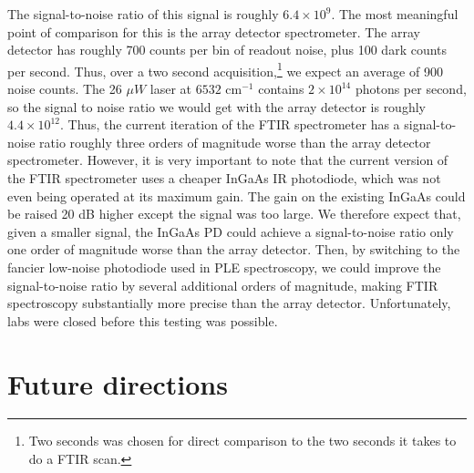 \documentclass[12pt]{report}
\newcommand{\wn}[1][ ]{cm$^{-1}$#1}
\begin{document}
The signal-to-noise ratio of this signal is roughly $6.4\times 10^{9}$. The most meaningful point of comparison for this is the array detector spectrometer. The array detector has roughly 700 counts per bin of readout noise, plus 100 dark counts per second. Thus, over a two second acquisition,\footnote{Two seconds was chosen for direct comparison to the two seconds it takes to do a FTIR scan.} we expect an average of 900 noise counts. The 26 $\mu W$ laser at $6532$ \wn contains $2\times 10^{14}$ photons per second, so the signal to noise ratio we would get with the array detector is roughly $4.4\times 10^{12}$. Thus, the current iteration of the FTIR spectrometer has a signal-to-noise ratio roughly three orders of magnitude worse than the array detector spectrometer. However, it is very important to note that the current version of the FTIR spectrometer uses a cheaper InGaAs IR photodiode, which was not even being operated at its maximum gain. The gain on the existing InGaAs could be raised 20 dB higher except the signal was too large. We therefore expect that, given a smaller signal, the InGaAs PD could achieve a signal-to-noise ratio only one order of magnitude worse than the array detector. Then, by switching to the fancier low-noise photodiode used in PLE spectroscopy, we could improve the signal-to-noise ratio by several additional orders of magnitude, making FTIR spectroscopy substantially more precise than the array detector. Unfortunately, labs were closed before this testing was possible.

\section{Future directions}
\end{document}
